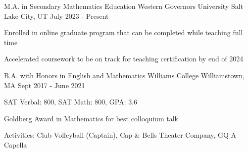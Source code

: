\begin{cventries}
  \cventry
  {M.A. in Secondary Mathematics Education}
  {Western Governors University}
  {Salt Lake City, UT}
  {July 2023 - Present}
  {
    \begin{cvitems}
      \item {Enrolled in online graduate program that can be completed while teaching full time}
      \item {Accelerated coursework to be on track for teaching certification by end of 2024}
    \end{cvitems}
  }
  \cventry
  {B.A. with Honors in English and Mathematics}
  {Williams College}
  {Williamstown, MA}
  {Sept 2017 - June 2021}
  {
    \begin{cvitems}
      \item {SAT Verbal: 800, SAT Math: 800, GPA: 3.6}
      \item {Goldberg Award in Mathematics for best colloquium talk}
      \item {Activities: Club Volleyball (Captain), Cap \& Bells Theater Company, GQ A Capella}
    \end{cvitems}
  }
\end{cventries}
